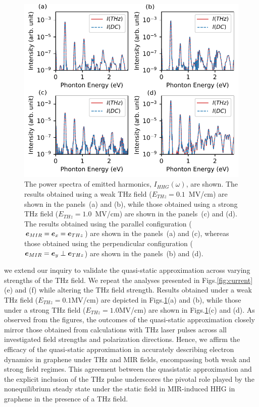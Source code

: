 \begin{figure}[tb]
\includegraphics[width=0.9\linewidth]{pic/SI_hhg.pdf}
\caption{\label{fig:quasi-static}
The power spectra of emitted harmonics, $I_{HHG}(\omega)$, are shown. The results obtained using a weak THz field ($E_{THz}=0.1$~MV/cm) are shown in the panels~(a) and (b), while those obtained using a strong THz field ($E_{THz}=1.0$~MV/cm) are shown in the panels~(c) and (d). The results obtained using the parallel configuration ($\boldsymbol e_{MIR}=\boldsymbol e_x = \boldsymbol e_{THz}$) are shown in the panels~(a) and (c), whereas those obtained using the perpendicular configuration ($\boldsymbol e_{MIR}=\boldsymbol e_y \perp \boldsymbol e_{THz}$) are shown in the panels~(b) and (d).
}
\end{figure}

 we extend our inquiry to validate the quasi-static approximation across varying strengths of the THz field. We repeat the analyses presented in Figs.\ref{fig:current}(e) and (f) while altering the THz field strength. Results obtained under a weak THz field ($E_{THz}=0.1$MV/cm) are depicted in Figs.\ref{fig:quasi-static}(a) and (b), while those under a strong THz field ($E_{THz}=1.0$MV/cm) are shown in Figs.\ref{fig:quasi-static}(c) and (d). As observed from the figures, the outcomes of the quasi-static approximation closely mirror those obtained from calculations with THz laser pulses across all investigated field strengths and polarization directions. Hence, we affirm the efficacy of the quasi-static approximation in accurately describing electron dynamics in graphene under THz and MIR fields, encompassing both weak and strong field regimes.
This agreement between the quasistatic approximation and the explicit inclusion of the THz pulse underscores the pivotal role played by the nonequilibrium steady state under the static field in MIR-induced HHG in graphene in the presence of a THz field.
